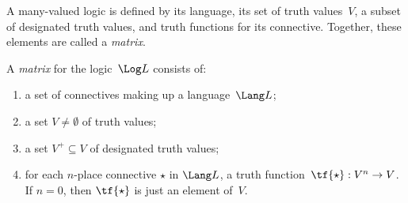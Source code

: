 \documentclass[../../../include/open-logic-section]{subfiles}
\begin{document}

A many-valued logic is defined by its language, its set of truth
values~$V$, a subset of designated truth values, and truth functions
for its connective.  Together, these elements are called a \emph{matrix}.  

\begin{defn}[Matrix]
A \emph{matrix} for the logic~$\Log L$ consists of:
\begin{enumerate}
\item a set of connectives making up a language~$\Lang L$;
\item a set $V \neq \emptyset$ of truth values;
\item a set $V^+ \subseteq V$ of designated truth values;
\item for each $n$-place connective $\star$ in $\Lang L$, a truth
function~$\tf{\star} : V^n \to V$. If $n = 0$, then $\tf{\star}$ is
just an element of~$V$.
\end{enumerate}
\end{defn}
\end{document}
